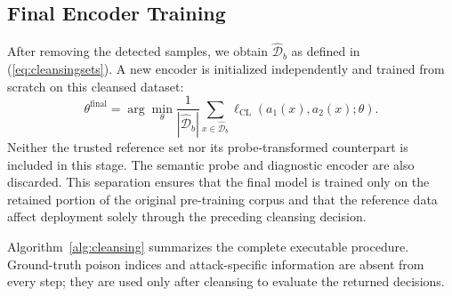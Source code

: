 \documentclass[10pt,journal]{IEEEtran}
\begin{document}
\subsection{Final Encoder Training}
\label{sec:final_training}

After removing the detected samples, we obtain
$\widehat{\mathcal{D}}_{b}$ as defined in
(\ref{eq:cleansingsets}). A new encoder is initialized independently
and trained from scratch on this cleansed dataset:
\begin{equation}
    \theta^{\mathrm{final}}
    =
    \arg\min_{\theta}
    \frac{1}{|\widehat{\mathcal{D}}_{b}|}
    \sum_{x\in\widehat{\mathcal{D}}_{b}}
    \ell_{\mathrm{CL}}
    \left(a_1(x),a_2(x);\theta\right).
    \label{eq:final_training_objective}
\end{equation}
Neither the trusted reference set nor its probe-transformed counterpart
is included in this stage. The semantic probe and diagnostic encoder
are also discarded. This separation ensures that the final model is
trained only on the retained portion of the original pre-training
corpus and that the reference data affect deployment solely through
the preceding cleansing decision.

Algorithm~\ref{alg:cleansing} summarizes the complete executable
procedure. Ground-truth poison indices and attack-specific information
are absent from every step; they are used only after cleansing to
evaluate the returned decisions.
\end{document}
